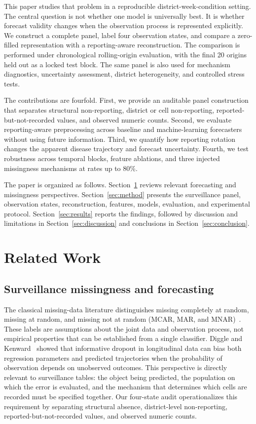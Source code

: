\documentclass[runningheads]{llncs}
\begin{document}
This paper studies that problem in a reproducible district-week-condition setting. The central question is not whether one model is universally best. It is whether forecast validity changes when the observation process is represented explicitly. We construct a complete panel, label four observation states, and compare a zero-filled representation with a reporting-aware reconstruction. The comparison is performed under chronological rolling-origin evaluation, with the final 20 origins held out as a locked test block. The same panel is also used for mechanism diagnostics, uncertainty assessment, district heterogeneity, and controlled stress tests.

The contributions are fourfold. First, we provide an auditable panel construction that separates structural non-reporting, district or cell non-reporting, reported-but-not-recorded values, and observed numeric counts. Second, we evaluate reporting-aware preprocessing across baseline and machine-learning forecasters without using future information. Third, we quantify how reporting rotation changes the apparent disease trajectory and forecast uncertainty. Fourth, we test robustness across temporal blocks, feature ablations, and three injected missingness mechanisms at rates up to 80\%.

The paper is organized as follows. Section~\ref{sec:related} reviews relevant forecasting and missingness perspectives. Section~\ref{sec:method} presents the surveillance panel, observation states, reconstruction, features, models, evaluation, and experimental protocol. Section~\ref{sec:results} reports the findings, followed by discussion and limitations in Section~\ref{sec:discussion} and conclusions in Section~\ref{sec:conclusion}.

\section{Related Work}\label{sec:related}
\begingroup\sloppy

\subsection{Surveillance missingness and forecasting}

The classical missing-data literature distinguishes missing completely at random, missing at random, and missing not at random (MCAR, MAR, and MNAR)~\cite{rubin1976inference,little2019statistical}. These labels are assumptions about the joint data and observation process, not empirical properties that can be established from a single classifier. Diggle and Kenward~\cite{diggle1994informative} showed that informative dropout in longitudinal data can bias both regression parameters and predicted trajectories when the probability of observation depends on unobserved outcomes. This perspective is directly relevant to surveillance tables: the object being predicted, the population on which the error is evaluated, and the mechanism that determines which cells are recorded must be specified together. Our four-state audit operationalizes this requirement by separating structural absence, district-level non-reporting, reported-but-not-recorded values, and observed numeric counts.
\end{document}
